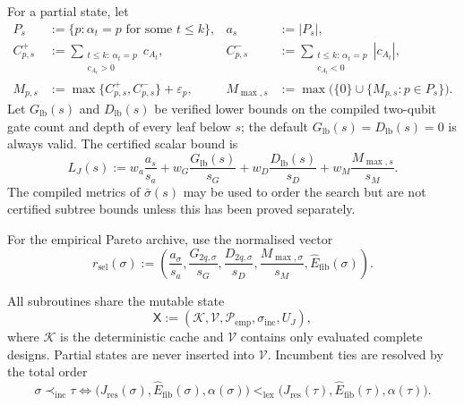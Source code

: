 \documentclass[a4paper,onecolumn,11pt,unpublished]{quantumarticle}
\theoremstyle{remark}
\begin{document}
For a partial state, let
\begin{align}
P_s&:=\{p:\alpha_t=p\text{ for some }t\le k\},
&a_s&:=|P_s|,\label{eq:app-partial-pairs}\\
C^+_{p,s}&:=\sum_{\substack{t\le k:\,\alpha_t=p\\ c_{A_t}>0}}c_{A_t},
&C^-_{p,s}&:=\sum_{\substack{t\le k:\,\alpha_t=p\\ c_{A_t}<0}}|c_{A_t}|,
\label{eq:app-signed-masses}\\
M_{p,s}&:=\max\{C^+_{p,s},C^-_{p,s}\}+\varepsilon_p,
&M_{\max,s}&:=\max\bigl(\{0\}\cup\{M_{p,s}:p\in P_s\}\bigr).
\label{eq:app-partial-penalties}
\end{align}
Let $G_{\mathrm{lb}}(s)$ and $D_{\mathrm{lb}}(s)$ be verified lower bounds on the
compiled two-qubit gate count and depth of every leaf below $s$; the default
$G_{\mathrm{lb}}(s)=D_{\mathrm{lb}}(s)=0$ is always valid.  The certified scalar bound is
\begin{equation}
L_J(s):=
w_a\frac{a_s}{s_a}
+w_G\frac{G_{\mathrm{lb}}(s)}{s_G}
+w_D\frac{D_{\mathrm{lb}}(s)}{s_D}
+w_M\frac{M_{\max,s}}{s_M}.
\label{eq:app-certified-node-bound}
\end{equation}
The compiled metrics of $\bar\sigma(s)$ may be used to order the search but are not
certified subtree bounds unless this has been proved separately.

For the empirical Pareto archive, use the normalised vector
\begin{equation}
    r_{\mathrm{sel}}(\sigma)
    :=
    \left(
        \frac{a_\sigma}{s_a},
        \frac{G_{2q,\sigma}}{s_G},
        \frac{D_{2q,\sigma}}{s_D},
        \frac{M_{\max,\sigma}}{s_M},
        \widehat E_{\mathrm{fib}}(\sigma)
    \right).
    \label{eq:app-pareto-vector}
\end{equation}

All subroutines share the mutable state
\begin{equation}
\mathsf X
:=(\mathcal K,\mathcal V,\mathcal P_{\mathrm{emp}},
\sigma_{\mathrm{inc}},U_J),
\label{eq:app-shared-search-state}
\end{equation}
where $\mathcal K$ is the deterministic cache and $\mathcal V$ contains only evaluated
complete designs.  Partial states are never inserted into $\mathcal V$.  Incumbent ties
are resolved by the total order
\begin{equation}
\sigma\prec_{\mathrm{inc}}\tau
\iff
\bigl(J_{\mathrm{res}}(\sigma),\widehat E_{\mathrm{fib}}(\sigma),\alpha(\sigma)\bigr)
<_{\mathrm{lex}}
\bigl(J_{\mathrm{res}}(\tau),\widehat E_{\mathrm{fib}}(\tau),\alpha(\tau)\bigr).
\label{eq:app-incumbent-order}
\end{equation}
\end{document}
